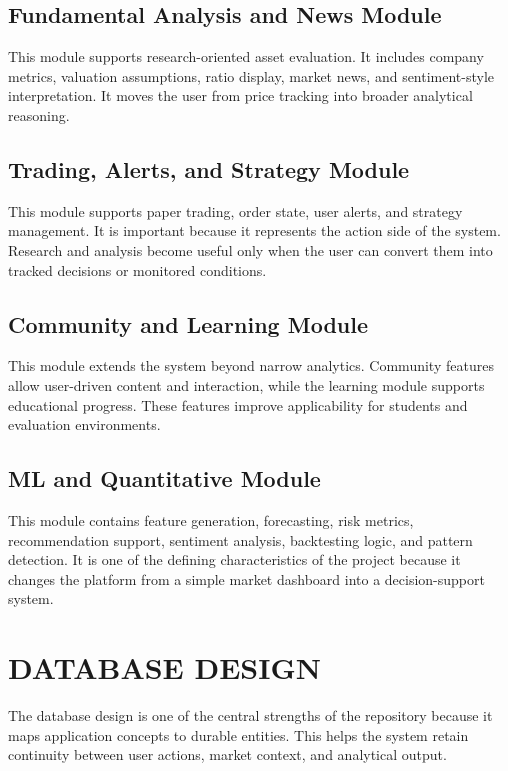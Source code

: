 \documentclass[12pt,a4paper]{report}
\begin{document}
\subsection{Fundamental Analysis and News Module}
This module supports research-oriented asset evaluation. It includes company metrics, valuation assumptions, ratio display, market news, and sentiment-style interpretation. It moves the user from price tracking into broader analytical reasoning.

\subsection{Trading, Alerts, and Strategy Module}
This module supports paper trading, order state, user alerts, and strategy management. It is important because it represents the action side of the system. Research and analysis become useful only when the user can convert them into tracked decisions or monitored conditions.

\subsection{Community and Learning Module}
This module extends the system beyond narrow analytics. Community features allow user-driven content and interaction, while the learning module supports educational progress. These features improve applicability for students and evaluation environments.

\subsection{ML and Quantitative Module}
This module contains feature generation, forecasting, risk metrics, recommendation support, sentiment analysis, backtesting logic, and pattern detection. It is one of the defining characteristics of the project because it changes the platform from a simple market dashboard into a decision-support system.

\section{DATABASE DESIGN}
The database design is one of the central strengths of the repository because it maps application concepts to durable entities. This helps the system retain continuity between user actions, market context, and analytical output.
\end{document}
